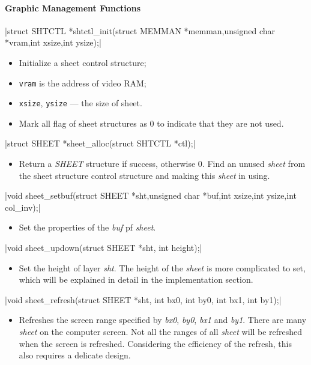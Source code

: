 \documentclass{swfcthesis}
\begin{document}
\paragraph{Graphic Management Functions}

\csingle|struct SHTCTL *shtctl_init(struct MEMMAN *memman,unsigned char *vram,int xsize,int ysize);|
\begin{itemize}
\item Initialize a sheet control structure;
\item \texttt{vram} is the address of video RAM;
\item \texttt{xsize}, \texttt{ysize} — the size of sheet.
\item Mark all flag of sheet structures as 0 to indicate that they are not used.
  
\end{itemize}

\csingle|struct SHEET *sheet_alloc(struct SHTCTL *ctl);|
\begin{itemize}
\item Return a \emph{SHEET} structure if success, otherwise 0. Find an unused \emph{sheet} from
  the sheet structure control structure and making this \emph{sheet} in using.
  
\end{itemize}

\csingle|void sheet_setbuf(struct SHEET *sht,unsigned char *buf,int xsize,int ysize,int col_inv);|
\begin{itemize}
\item Set the properties of the \emph{buf} pf \emph{sheet}. 
\end{itemize}

\csingle|void sheet_updown(struct SHEET *sht, int height);|
\begin{itemize}
\item Set the height of layer \emph{sht}. The height of the \emph{sheet} is more complicated to
  set, which will be explained in detail in the implementation section.
  
  
\end{itemize}

\csingle|void sheet_refresh(struct SHEET *sht, int bx0, int by0, int bx1, int by1);|
\begin{itemize}
\item Refreshes the screen range specified by \emph{bx0}, \emph{by0}, \emph{bx1} and
  \emph{by1}. There are many \emph{sheet} on the computer screen. Not all the ranges of
  all \emph{sheet} will be refreshed when the screen is refreshed. Considering the
  efficiency of the refresh, this also requires a delicate design. 
\end{itemize}
\end{document}
